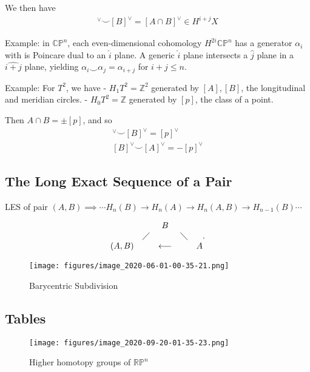 We then have
\begin{align*}
[A]^\vee\smile [B]^\vee= [A\cap B]^\vee\in H^{i+j} X
\end{align*}

Example: in \({\mathbb{CP}}^n\), each even-dimensional cohomology
\(H^{2i}{\mathbb{CP}}^n\) has a generator \(\alpha_i\) with is Poincare
dual to an \(\widehat{i}\) plane. A generic \(\widehat{i}\) plane
intersects a \(\widehat{j}\) plane in a \(\widehat{i+j}\) plane,
yielding \(\alpha_i \smile \alpha_j = \alpha_{i+j}\) for \(i+j \leq n\).

Example: For \(T^2\), we have - \(H_1T^2 = {\mathbb{Z}}^2\) generated by
\([A], [B]\), the longitudinal and meridian circles. -
\(H_0T^2 = {\mathbb{Z}}\) generated by \([p]\), the class of a point.

Then \(A\cap B = \pm [p]\), and so
\begin{align*}
[A]^\vee\smile [B]^\vee= [p]^\vee\\
[B]^\vee\smile [A]^\vee= -[p]^\vee
\end{align*}

\hypertarget{the-long-exact-sequence-of-a-pair}{%
\subsection{The Long Exact Sequence of a
Pair}\label{the-long-exact-sequence-of-a-pair}}

LES of pair
\((A,B) \implies \cdots H_n(B) \to H_n(A) \to H_n(A,B) \to H_{n-1}(B) \cdots\)

\begin{align*} \begin{matrix}   && B & \\ &\diagup &  & \diagdown \\ (A,B) & & \longleftarrow &  & A \end{matrix} .\end{align*}

\begin{figure}
\centering
\texttt{[image: figures/image\_2020-06-01-00-35-21.png]}
\caption{Barycentric Subdivision}
\end{figure}

\hypertarget{tables}{%
\subsection{Tables}\label{tables}}

\begin{figure}
\centering
\texttt{[image: figures/image\_2020-09-20-01-35-23.png]}
\caption{Higher homotopy groups of \({\mathbb{RP}}^n\)}
\end{figure}

